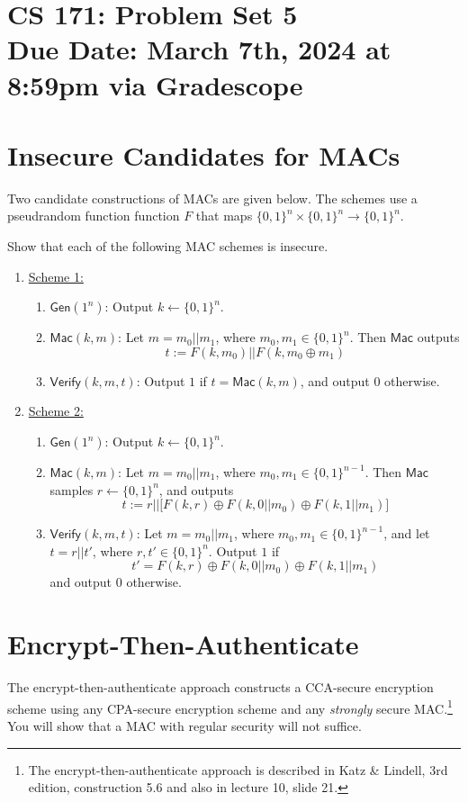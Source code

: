 \documentclass[11pt]{article}
\numberwithin{equation}{section}
\newcommand{\Gen}{\mathsf{Gen}}
\newcommand{\bin}{\{0,1\}}
\newcommand{\bit}{\bin}
\newcommand{\duedate}{March 7th, 2024 at 8:59pm via Gradescope}
\newcommand{\mac}{\mathsf{Mac}}
\newcommand{\verify}{\mathsf{Verify}}
\begin{document}
\section*{CS 171: Problem Set 5\\ {\small Due Date: \duedate} }

\section{Insecure Candidates for MACs}
Two candidate constructions of MACs are given below. The schemes use a pseudrandom function function $F$ that maps $\bit^n\times \bit^n \rightarrow \bit^n$.

Show that each of the following MAC schemes is insecure.

\begin{enumerate}
    \item \underline{Scheme 1:}
    \begin{enumerate}
        \item $\Gen(1^n)$: Output $k \leftarrow \{0,1\}^n$.
        \item $\mac(k, m)$: Let $m = m_0 || m_1$, where $m_0, m_1 \in \{0,1\}^{n}$. Then $\mac$ outputs 
        \[t := F(k, m_0) || F(k, m_0 \oplus m_1)\]
        \item $\verify(k, m, t)$: Output $1$ if $t = \mac(k, m)$, and output $0$ otherwise.
    \end{enumerate}

    \item \underline{Scheme 2:}
    \begin{enumerate}
        \item $\Gen(1^n)$: Output $k \leftarrow \{0,1\}^n$.
        \item $\mac(k, m)$: Let $m = m_0 || m_1$, where $m_0, m_1 \in \{0,1\}^{n-1}$. Then $\mac$ samples $r \leftarrow \bit^{n}$, and outputs \[t:= r || \big[F(k, r) \oplus F(k, 0||m_0) \oplus F(k, 1||m_1)\big]\]
        \item $\verify(k, m, t)$: Let $m = m_0 || m_1$, where $m_0, m_1 \in \{0,1\}^{n-1}$, and let $t = r || t'$, where $r, t' \in \bit^n$. Output $1$ if 
        \[t' = F(k, r) \oplus F(k, 0||m_0) \oplus F(k, 1||m_1)\] 
        and output $0$ otherwise.
    \end{enumerate}
\end{enumerate}

\pagebreak


\section{Encrypt-Then-Authenticate}
The encrypt-then-authenticate approach constructs a CCA-secure encryption scheme using any CPA-secure encryption scheme and any \textit{strongly} secure MAC.\footnote{The encrypt-then-authenticate approach is described in Katz \& Lindell, 3rd edition, construction 5.6 and also in lecture 10, slide 21.} You will show that a MAC with regular security will not suffice.
\end{document}

